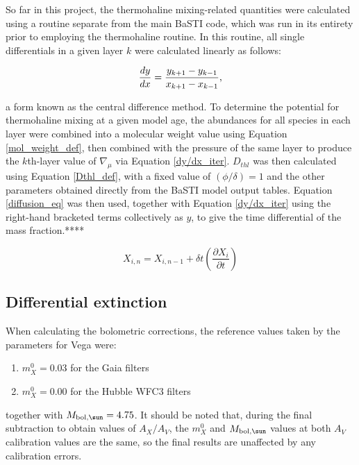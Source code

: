 \documentclass[usenatbib]{mnras}
\begin{document}
So far in this project, the thermohaline mixing-related quantities were calculated using a routine separate from the main BaSTI code, which was run in its entirety prior to employing the thermohaline routine. In this routine, all single differentials in a given layer $k$ were calculated linearly as follows:

\begin{equation}
\frac{dy}{dx} = \frac{y_{k+1} - y_{k-1}}{x_{k+1} - x_{k-1}} \textnormal{,}
\label{dy/dx_iter}
\end{equation}

a form known as the central difference method.
To determine the potential for thermohaline mixing at a given model age, the abundances for all species in each layer were combined into a molecular weight value using Equation \ref{mol_weight_def}, then combined with the pressure of the same layer to produce the $k$th-layer value of $\nabla_{\mu}$ via Equation \ref{dy/dx_iter}. $D_{thl}$ was then calculated using Equation \ref{Dthl_def}, with a fixed value of $(\phi/\delta) = 1$ and the other parameters obtained directly from the BaSTI model output tables. Equation \ref{diffusion_eq} was then used, together with Equation \ref{dy/dx_iter} using the right-hand bracketed terms collectively as $y$, to give the time differential of the mass fraction.****

\begin{equation}
X_{i,n} = X_{i,n-1} + \delta t \left( \frac{\partial X_{i}}{\partial t}\right)
\label{iter_timeind}
\end{equation}

\subsection{Differential extinction}
When calculating the bolometric corrections, the reference values taken by the parameters for Vega were:
\begin{enumerate}
\item $m_{X}^{0} = 0.03$ for the Gaia filters
\item $m_{X}^{0} = 0.00$ for the Hubble WFC3 filters
\end{enumerate}

together with $M_{\textnormal{bol},\sun} = 4.75$. It should be noted that, during the final subtraction to obtain values of $A_{X}/A_{V}$, the $m_{X}^{0}$ and $M_{\textnormal{bol},\sun}$ values at both $A_{V}$ calibration values are the same, so the final results are unaffected by any calibration errors.
\end{document}
